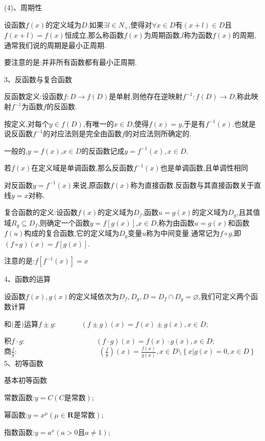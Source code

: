 \documentclass[UTF8]{ctexart}
\begin{document}
(4)、周期性

设函数$f(x)$的定义域为$D$.如果$\exists l\in N_{+}$,使得对$\forall x\in D$有$(x+l)\in D$且$f(x+l)=f(x)$恒成立,那么称函数$f(x)$为周期函数,$l$称为函数$f(x)$的周期,通常我们说的周期是最小正周期.

要注意的是:并非所有函数都有最小正周期.

3、反函数与复合函数

反函数定义:设函数$f:D\to f(D)$是单射,则他存在逆映射$f^{-1}:f(D)\to D$,称此映射$f^{-1}$为函数$f$的反函数.

按定义,对每个$y\in f(D)$,有唯一的$x\in D$,使得$f(x)=y$,于是有$f^{-1}(x)$.也就是说反函数$f^{-1}$的对应法则是完全由函数$f$的对应法则所确定的.

一般的,$y=f(x)$,$x\in D$的反函数记成$y=f^{-1}(x),x\in D$.

若$f(x)$在定义域是单调函数,那么反函数$f^{-1}(x)$也是单调函数,且单调性相同

对反函数$y=f^{-1}(x)$来说,原函数$f(x)$称为直接函数.反函数与其直接函数关于直线$y=x$对称.

复合函数的定义:设函数$f(x)$的定义域为$D_{f}$,函数$u=g(x)$的定义域为$D_{g}$,且其值域$R_g\subseteq D_{f}$,则确定一个函数$y=f\left[g(x)\right]$,$x\in D$,称为由函数$u=g(x)$和函数$f(u)$构成的复合函数,它的定义域为$D_{g}$变量$u$称为中间变量.通常记为$f\circ g$,即$(f\circ g)(x)=f\left[g(x)\right]$.

注意的是:$f\left[f^{-1}(x)\right]=x$

4、函数的运算

设函数$f(x),g(x)$的定义域依次为$D_{f},D_{g},D=D_{f}\cap D_{g}=\varnothing $,我们可定义两个函数计算

和$($差$)$运算$f\pm g$:\ \ \ \ \ \ \ $(f\pm g)(x)=f(x)\pm g(x),x\in D$;

积$f\cdot g$:\ \ \ \ \ \ \ \ \ \ \ \ \ \ \ \ \ \ \ \ $(f\cdot g)(x)=f(x)\cdot g(x),x\in D$;\\

商$\displaystyle \frac{f}{g}$:\ \ \ \ \ \ \ \ \ \ \ \ \ \ \ \ \ \ \ \ \ \ \ $\displaystyle (\frac{f}{g})(x)=\frac{f(x)}{g(x)},x\in D\setminus \left\{x|g(x)=0,x\in D\right\} $\\

5、初等函数

基本初等函数

常数函数:$y=C(C\text{是常数})$;

幂函数:$y=x^{\mu }(\mu \in \mathbf{R} \text{是常数})$;

指数函数:$y=a^{x}(a>0\text{且}a\neq 1)$;
\end{document}
